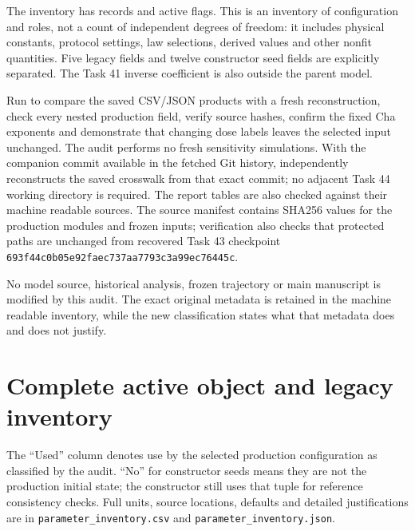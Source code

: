 \documentclass[11pt,a4paper]{article}
\begin{document}
The inventory has \InventoryCount{} records and \ActiveCount{} active flags. This is an inventory of configuration and roles, not a count of independent degrees of freedom: it includes physical constants, protocol settings, law selections, derived values and other nonfit quantities. Five legacy fields and twelve constructor seed fields are explicitly separated. The Task 41 inverse coefficient is also outside the parent model.

Run  to compare the saved CSV/JSON products with a fresh reconstruction, check every nested production field, verify source hashes, confirm the fixed Cha exponents and demonstrate that changing dose labels leaves the selected input unchanged. The audit performs no fresh sensitivity simulations. With the companion commit available in the fetched Git history,  independently reconstructs the saved crosswalk from that exact commit; no adjacent Task 44 working directory is required. The report tables are also checked against their machine readable sources. The source manifest contains SHA256 values for the production modules and frozen inputs; verification also checks that protected paths are unchanged from recovered Task 43 checkpoint \texttt{693f44c0b05e92faec737aa7793c3a99ec76445c}.

No model source, historical analysis, frozen trajectory or main manuscript is modified by this audit. The exact original metadata is retained in the machine readable inventory, while the new classification states what that metadata does and does not justify.

\appendix
\section{Complete active object and legacy inventory}
The ``Used'' column denotes use by the selected production configuration as classified by the audit. ``No'' for constructor seeds means they are not the production initial state; the constructor still uses that tuple for reference consistency checks. Full units, source locations, defaults and detailed justifications are in \texttt{parameter\_inventory.csv} and \texttt{parameter\_inventory.json}.



\end{document}

